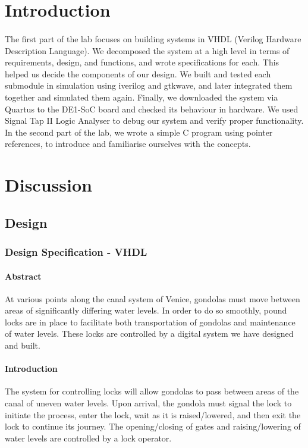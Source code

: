 \documentclass{article}
\begin{document}
\section{Introduction}
\paragraph{} The first part of the lab focuses on building systems in VHDL (Verilog Hardware Description Language). We decomposed the system at a high level in terms of requirements, design, and functions, and wrote specifications for each. This helped us decide the components of our design. We built and tested each submodule in simulation using iverilog and gtkwave, and later integrated them together and simulated them again. Finally, we downloaded the system via Quartus to the DE1-SoC board and checked its behaviour in hardware. We used Signal Tap II Logic Analyser to debug our system and verify proper functionality. In the second part of the lab, we wrote a simple C program using pointer references, to introduce and familiarise ourselves with the concepts.


\section{Discussion}
	\subsection{Design}
		\subsubsection{Design Specification - VHDL}
  		\paragraph{Abstract} At various points along the canal system of Venice, gondolas must move between areas of significantly differing water levels. In order to do so smoothly, pound locks are in place to facilitate both transportation of gondolas and maintenance of water levels. These locks are controlled by a digital system we have designed and built.

      \paragraph{Introduction} The system for controlling locks will allow gondolas to pass between areas of the canal of uneven water levels. Upon arrival, the gondola must signal the lock to initiate the process, enter the lock, wait as it is raised/lowered, and then exit the lock to continue its journey. The opening/closing of gates and raising/lowering of water levels are controlled by a lock operator.
\end{document}
